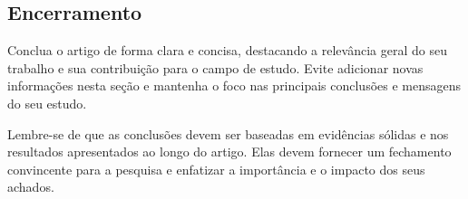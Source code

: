 \subsection{Encerramento} Conclua o artigo de forma clara e concisa, destacando a relevância geral do seu trabalho e sua contribuição para o campo de estudo. Evite adicionar novas informações nesta seção e mantenha o foco nas principais conclusões e mensagens do seu estudo.

Lembre-se de que as conclusões devem ser baseadas em evidências sólidas e nos resultados apresentados ao longo do artigo. Elas devem fornecer um fechamento convincente para a pesquisa e enfatizar a importância e o impacto dos seus achados.